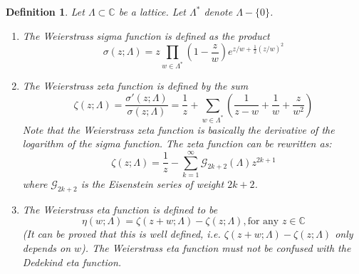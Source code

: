 \documentclass[12pt]{article}
\newtheorem{defn}{Definition}
\newcommand{\Complex}{\mathbb{C}}
\begin{document}
\begin{defn}
Let $\Lambda\subset\Complex$ be a lattice. Let $\Lambda^{\ast}$
denote $\Lambda-\{ 0 \}$.
\begin{enumerate}
\item The \emph{Weierstrass sigma function} is defined as the
product
$$\sigma(z;\Lambda)=z\prod_{w\in\Lambda^{\ast}}\left(1-\frac{z}{w}\right)e^{z/w+\frac{1}{2}(z/w)^2}$$

\item The \emph{Weierstrass zeta function} is defined by the sum
$$\zeta(z;\Lambda)=\frac{\sigma'(z;\Lambda)}{\sigma(z;\Lambda)}=\frac{1}{z}+\sum_{w\in\Lambda^{\ast}}\left( \frac{1}{z-w}+\frac{1}{w}+\frac{z}{w^2}\right)$$
Note that the Weierstrass zeta function is basically the
derivative of the logarithm of the sigma function. The zeta
function can be rewritten as:
$$\zeta(z;\Lambda)=\frac{1}{z}-\sum_{k=1}^{\infty}\mathcal{G}_{2k+2}(\Lambda)z^{2k+1}$$
where $\mathcal{G}_{2k+2}$ is the Eisenstein series of weight
$2k+2$.

\item The \emph{Weierstrass eta function} is defined to be
$$\eta(w;\Lambda)=\zeta(z+w;\Lambda)-\zeta(z;\Lambda), \text{for
any } z\in\Complex$$ (It can be proved that this is well defined,
i.e. $\zeta(z+w;\Lambda)-\zeta(z;\Lambda)$ only depends on $w$).
The Weierstrass eta function must not be confused with the
Dedekind eta function.
\end{enumerate}
\end{defn}
\end{document}
